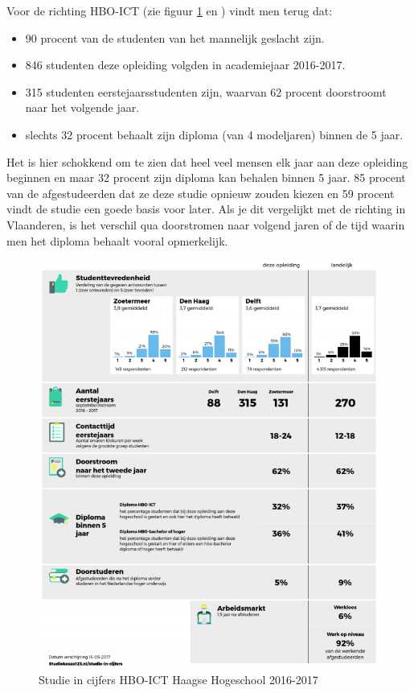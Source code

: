 Voor de richting HBO-ICT (zie figuur \ref{fig:hbo-ict} en \textcite{Studiekeuze2017}) vindt men terug dat:
\begin{itemize}
	\item 90 procent van de studenten van het mannelijk geslacht zijn.
	\item 846 studenten deze opleiding volgden in academiejaar 2016-2017.
	\item 315 studenten eerstejaarsstudenten zijn, waarvan 62 procent doorstroomt naar het volgende jaar.
	\item slechts 32 procent behaalt zijn diploma (van 4 modeljaren) binnen de 5 jaar.
\end{itemize}

Het is hier schokkend om te zien dat heel veel mensen elk jaar aan deze opleiding beginnen en maar 32 procent zijn diploma kan behalen binnen 5 jaar. 85 procent van de afgestudeerden dat ze deze studie opnieuw zouden kiezen en 59 procent vindt de studie een goede basis voor later. Als je dit vergelijkt met de richting in Vlaanderen, is het verschil qua doorstromen naar volgend jaren of de tijd waarin men het diploma behaalt vooral opmerkelijk.

\begin{figure}
	\includegraphics[width=\textwidth]
	{img/hbo-ict.png}
	\caption{Studie in cijfers HBO-ICT Haagse Hogeschool 2016-2017}
	\label{fig:hbo-ict}
\end{figure}


